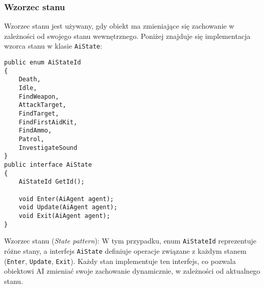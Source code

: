 \subsubsection{Wzorzec stanu}\label{subsubsec:state}
Wzorzec stanu jest używany, gdy obiekt ma zmieniające się zachowanie w zależności od swojego stanu wewnętrznego. Poniżej znajduje się implementacja wzorca stanu w klasie \texttt{AiState}:
\begin{codebox}
\begin{lstlisting}[language={[Sharp]C}, label={listing:AiState.cs}]
public enum AiStateId
{
    Death,
    Idle,
    FindWeapon,
    AttackTarget,
    FindTarget,
    FindFirstAidKit,
    FindAmmo,
    Patrol,
    InvestigateSound
}
public interface AiState
{
    AiStateId GetId();

    void Enter(AiAgent agent);
    void Update(AiAgent agent);
    void Exit(AiAgent agent);
}
\end{lstlisting}
\end{codebox}
Wzorzec stanu (\textit{State pattern}): W tym przypadku, enum \texttt{AiStateId} reprezentuje różne stany, a interfejs \texttt{AiState} definiuje operacje związane z każdym stanem (\texttt{Enter}, \texttt{Update}, \texttt{Exit}). Każdy stan implementuje ten interfejs, co pozwala obiektowi AI zmieniać swoje zachowanie dynamicznie, w zależności od aktualnego stanu.

